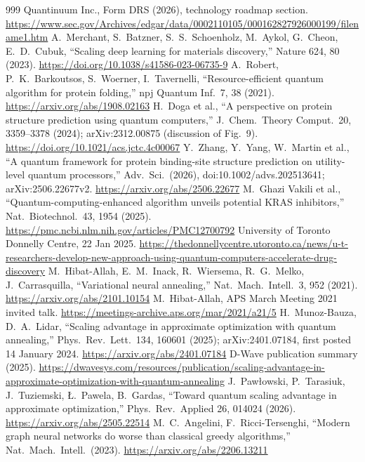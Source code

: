 \documentclass[10pt,a4paper]{article}
\begin{document}
\begin{thebibliography}{999}
 Quantinuum Inc., Form DRS (2026), technology roadmap section. \url{https://www.sec.gov/Archives/edgar/data/0002110105/000162827926000199/filename1.htm}
 A.~Merchant, S.~Batzner, S.~S.~Schoenholz, M.~Aykol, G.~Cheon, E.~D.~Cubuk, ``Scaling deep learning for materials discovery,'' Nature 624, 80 (2023). \url{https://doi.org/10.1038/s41586-023-06735-9}
 A.~Robert, P.~K.~Barkoutsos, S.~Woerner, I.~Tavernelli, ``Resource-efficient quantum algorithm for protein folding,'' npj Quantum Inf.\ 7, 38 (2021). \url{https://arxiv.org/abs/1908.02163}
 H.~Doga et al., ``A perspective on protein structure prediction using quantum computers,'' J.\ Chem.\ Theory Comput.\ 20, 3359--3378 (2024); arXiv:2312.00875 (discussion of Fig.~9). \url{https://doi.org/10.1021/acs.jctc.4c00067}
 Y.~Zhang, Y.~Yang, W.~Martin et al., ``A quantum framework for protein binding-site structure prediction on utility-level quantum processors,'' Adv.\ Sci.\ (2026), doi:10.1002/advs.202513641; arXiv:2506.22677v2. \url{https://arxiv.org/abs/2506.22677}
 M.~Ghazi Vakili et al., ``Quantum-computing-enhanced algorithm unveils potential KRAS inhibitors,'' Nat.\ Biotechnol.\ 43, 1954 (2025). \url{https://pmc.ncbi.nlm.nih.gov/articles/PMC12700792}
 University of Toronto Donnelly Centre, 22 Jan 2025. \url{https://thedonnellycentre.utoronto.ca/news/u-t-researchers-develop-new-approach-using-quantum-computers-accelerate-drug-discovery}
 M.~Hibat-Allah, E.~M.~Inack, R.~Wiersema, R.~G.~Melko, J.~Carrasquilla, ``Variational neural annealing,'' Nat.\ Mach.\ Intell.\ 3, 952 (2021). \url{https://arxiv.org/abs/2101.10154}
 M.~Hibat-Allah, APS March Meeting 2021 invited talk. \url{https://meetings-archive.aps.org/mar/2021/a21/5}
 H.~Munoz-Bauza, D.~A.~Lidar, ``Scaling advantage in approximate optimization with quantum annealing,'' Phys.\ Rev.\ Lett.\ 134, 160601 (2025); arXiv:2401.07184, first posted 14 January 2024. \url{https://arxiv.org/abs/2401.07184}
 D-Wave publication summary (2025). \url{https://dwavesys.com/resources/publication/scaling-advantage-in-approximate-optimization-with-quantum-annealing}
 J.~Paw{\l}owski, P.~Tarasiuk, J.~Tuziemski, {\L}.~Pawela, B.~Gardas, ``Toward quantum scaling advantage in approximate optimization,'' Phys.\ Rev.\ Applied 26, 014024 (2026). \url{https://arxiv.org/abs/2505.22514}
 M.~C.~Angelini, F.~Ricci-Tersenghi, ``Modern graph neural networks do worse than classical greedy algorithms,'' Nat.\ Mach.\ Intell.\ (2023). \url{https://arxiv.org/abs/2206.13211}

\end{thebibliography}
\end{document}
